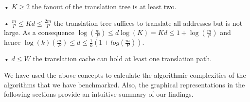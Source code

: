 • $K \geq 2$ the fanout of the translation tree is at least two.

• $\frac{m}{P}\leq Kd\leq\frac{2m}{P}$ the translation tree suffices to
translate all addresses but is not large. As a consequence 
$\log(\frac{m}{P})\leq d \log(K)=Kd\leq1+\log(\frac{m}{P})$ and hence
$\log(k)(\frac{m}{P})\leq d\leq \frac{1}{k}(1 + log(\frac{m}{P}))$.

• $d \leq W$ the translation cache can hold at least one translation path.

We have used the above concepts to calculate the algorithmic complexities of
the algorithms that we have benchmarked. Also, the graphical representations in
the following sections provide an intuitive summary of our findings.

